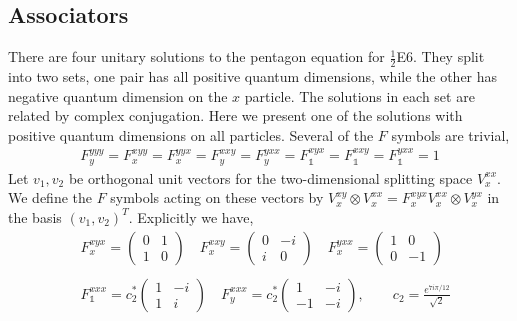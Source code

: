 \documentclass[12pt,a4paper]{article}
\newcommand{\tp}{\otimes}
\begin{document}
\subsection{Associators}
\label{E6Fsymbols}
There are four unitary solutions to the pentagon equation for $\frac{1}{2}$E6. They split into two sets, one pair has all positive quantum dimensions, while the other has negative quantum dimension on the $x$ particle. 
The solutions in each set are related by complex conjugation. 
Here we present one of the solutions with positive quantum dimensions on all particles. 
Several of the $F$ symbols are trivial,
\begin{align}
F^{yyy}_y = F^{xyy}_x = F^{yyx}_x = F^{xxy}_y  = F^{yxx}_y = F^{xyx}_{\mathds{1}} = F^{xxy}_{\mathds{1}} = F^{yxx}_{\mathds{1}}= 1
\end{align}
Let $v_1, v_2$ be orthogonal unit vectors for the two-dimensional splitting space $V^{xx}_x$. 
We define the $F$ symbols acting on these vectors by $V^{xy}_x \tp V^{xx}_x  = F^{xyx}_x V^{xx}_x \tp V^{yx}_x$ in the basis $(v_1, v_2)^{T}$.
Explicitly we have,
\begin{align}
&F^{xyx}_x = \left(\begin{matrix}
0&1\\
1&0
\end{matrix} \right) \quad
F^{xxy}_x = \left(\begin{matrix}
0&-i\\
i&0
\end{matrix} \right) \quad
F^{yxx}_x = \left(\begin{matrix}
1&0\\
0&-1
\end{matrix} \right) 
\\
\\
&F^{xxx}_{\mathds{1}} = c_2^* \left(\begin{matrix}
1&-i\\
1&i
\end{matrix} \right) \quad
F^{xxx}_y = c_2^*\left(\begin{matrix}
1&-i\\
-1&-i
\end{matrix} \right), \quad \quad c_2  = \frac{e^{7 i \pi/12}}{\sqrt{2}}
\end{align}
\end{document}
